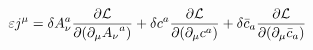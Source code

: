 \begin{equation}
\varepsilon j^{\mu} = \delta A_{\nu}^{a} \frac{\partial {\cal{L}}}{\partial ({\partial}_\mu {A_{\nu}}^{a})} + \delta
c^{a} \frac{\partial{\cal{L}}}{\partial (\partial_{\mu}c^{a})} +
\delta {\bar{c}}_{a} \frac{\partial{\cal{L}}}{\partial(\partial_{\mu}{\bar{c}}_a)}                
\end{equation}


